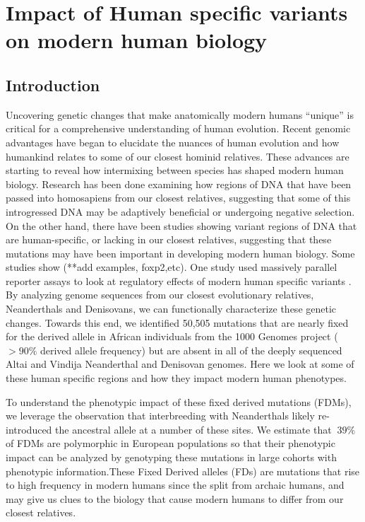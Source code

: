 \chapter{Impact of Human specific variants on modern human biology}
\section{Introduction}
Uncovering genetic changes that make anatomically modern humans “unique” is critical for a comprehensive understanding of human evolution. Recent genomic advantages have began to elucidate the nuances of human evolution and how humankind relates to some of our closest hominid relatives. These advances are starting to reveal how intermixing between species has shaped modern human biology. Research has been done examining how regions of DNA that have been passed into homosapiens from our closest relatives, suggesting that some of this introgressed DNA may be adaptively beneficial or undergoing negative selection. On the other hand, there have been studies showing variant regions of DNA that are human-specific, or lacking in our closest relatives, suggesting that these mutations may have been important in developing modern human biology. Some studies show (**add examples, foxp2,etc). One study used massively parallel reporter assays to look at regulatory effects of modern human specific variants \cite{weiss2021cis}.
By analyzing genome sequences from our closest evolutionary relatives, Neanderthals and Denisovans, we can functionally characterize these genetic changes. Towards this end, we identified 50,505 mutations that are nearly fixed for the derived allele in African individuals from the 1000 Genomes project ($>90\%$ derived allele frequency) but are absent in all of the deeply sequenced Altai and Vindija Neanderthal and Denisovan genomes. Here we look at some of these human specific regions and how they impact modern human phenotypes.

To understand the phenotypic impact of these fixed derived mutations (FDMs), we leverage the observation that interbreeding with Neanderthals likely re-introduced the ancestral allele at a number of these sites. We estimate that $~39\%$ of FDMs are polymorphic in European populations so that their phenotypic impact can be analyzed by genotyping these mutations in large cohorts with phenotypic information.These Fixed Derived alleles (FDs) are mutations that rise to high frequency  in  modern  humans  since  the  split  from  archaic humans, and may give us clues to the biology that cause modern humans to differ from our closest relatives.
